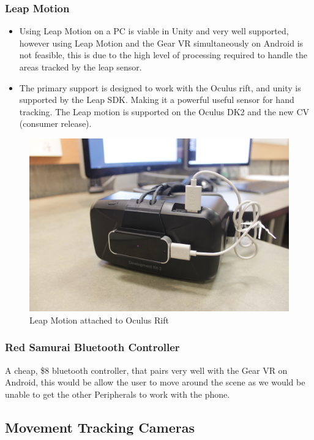 \documentclass[a4paper,10pt]{article}
\begin{document}
\subsubsection{Leap Motion}
\begin{itemize}
	\item Using Leap Motion on a PC is viable in Unity and very well supported, however using Leap Motion and the Gear VR simultaneously on Android is not feasible, this is due to the high level of processing required to
	handle the areas tracked by the leap sensor. 
	\item The primary support is designed to work with the Oculus rift, and unity is supported by the Leap SDK. Making it a powerful useful sensor for hand tracking. The 
	Leap motion is supported on the Oculus DK2 and the new CV (consumer release). 
\end{itemize}
\begin{figure}[H]
	\centerline{\includegraphics[scale= 0.08]{leap.jpg}}
	\caption{Leap Motion attached to Oculus Rift}
	\label{fig:leapImg}
\end{figure}
	
	
\subsubsection{Red Samurai Bluetooth Controller}
	A cheap, \$8 bluetooth controller, that pairs very well with the Gear VR on Android, this would be allow the user to move around the scene as we would be unable to get the other Peripherals to work with the phone.
\pagebreak
\subsection{Movement Tracking Cameras}
\end{document}

